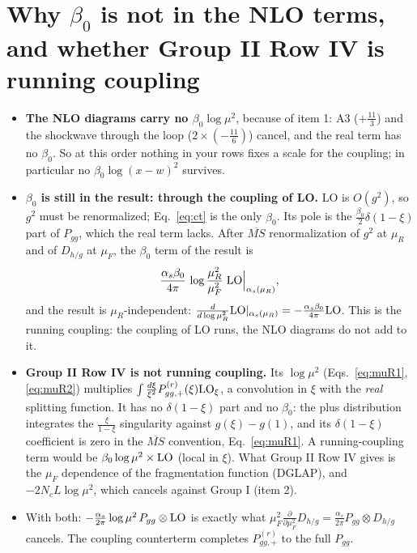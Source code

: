 \documentclass[10pt]{article}
\numberwithin{equation}{section}
\begin{document}
\section{Why \texorpdfstring{$\beta_0$}{beta0} is not in the NLO terms, and whether Group II Row IV is running coupling}\label{sec:why}
\begin{itemize}
\item \textbf{The NLO diagrams carry no $\beta_0\log\mu^2$}, because of item 1: A3 ($+\frac{11}{3}$) and the shockwave through the loop ($2\times(-\frac{11}{6})$) cancel, and the real term has no $\beta_0$. So at this order nothing in your rows fixes a scale for the coupling; in particular no $\beta_0\log(x-w)^2$ survives.
\item \textbf{$\beta_0$ is still in the result: through the coupling of LO.} LO is $O(g^2)$, so $g^2$ must be renormalized; Eq.~\eqref{eq:ct} is the only $\beta_0$. Its pole is the $\frac{\beta_0}{2}\delta(1-\xi)$ part of $P_{gg}$, which the real term lacks. After $\overline{MS}$ renormalization of $g^2$ at $\mu_R$ and of $D_{h/g}$ at $\mu_F$, the $\beta_0$ term of the result is
\begin{equation}
\frac{\alpha_s\beta_0}{4\pi}\,\log\frac{\mu_R^2}{\mu_F^2}\;{\rm LO}\Big|_{\alpha_s(\mu_R)},
\end{equation}
and the result is $\mu_R$-independent: $\frac{d}{d\log\mu_R^2}{\rm LO}|_{\alpha_s(\mu_R)}=-\frac{\alpha_s\beta_0}{4\pi}{\rm LO}$. This is the running coupling: the coupling of LO runs, the NLO diagrams do not add to it.
\item \textbf{Group II Row IV is not running coupling.} Its $\log\mu^2$ (Eqs.~\eqref{eq:muR1}, \eqref{eq:muR2}) multiplies $\int\frac{d\xi}{\xi^2}P^{(r)}_{gg,+}(\xi){\rm LO}_\xi$, a convolution in $\xi$ with the \emph{real} splitting function. It has no $\delta(1-\xi)$ part and no $\beta_0$: the plus distribution integrates the $\frac{\xi}{1-\xi}$ singularity against $g(\xi)-g(1)$, and its $\delta(1-\xi)$ coefficient is zero in the $\overline{MS}$ convention, Eq.~\eqref{eq:muR1}. A running-coupling term would be $\beta_0\log\mu^2\times{\rm LO}$ (local in $\xi$). What Group II Row IV gives is the $\mu_F$ dependence of the fragmentation function (DGLAP), and $-2N_cL\log\mu^2$, which cancels against Group I (item 2).
\item With both: $-\frac{\alpha_s}{2\pi}\log\mu^2\,P_{gg}\otimes{\rm LO}$ is exactly what $\mu_F^2\frac{\partial}{\partial\mu_F^2}D_{h/g}=\frac{\alpha_s}{2\pi}P_{gg}\otimes D_{h/g}$ cancels. The coupling counterterm completes $P^{(r)}_{gg,+}$ to the full $P_{gg}$.
\end{itemize}
\end{document}
